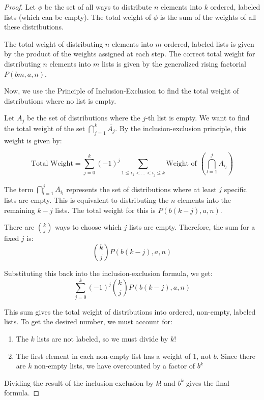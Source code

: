 \documentclass{article}
\newcommand{\rising}[3]{P(#1,#2,#3)}
\begin{document}
\begin{proof}
Let $\phi$ be the set of all ways to distribute $n$ elements into $k$ ordered, labeled lists (which can be empty). The total weight of $\phi$ is the sum of the weights of all these distributions.

The total weight of distributing $n$ elements into $m$ ordered, labeled lists is given by the product of the weights assigned at each step. The correct total weight for distributing $n$ elements into $m$ lists is given by the generalized rising factorial $\rising{bm}{a}{n}$.

Now, we use the Principle of Inclusion-Exclusion to find the total weight of distributions where no list is empty.

Let $A_j$ be the set of distributions where the $j$-th list is empty. We want to find the total weight of the set $\bigcap_{j=1}^k \overline{A_j}$. By the inclusion-exclusion principle, this weight is given by:

\begin{equation}
\text{Total Weight} = \sum_{j=0}^k (-1)^j \sum_{1 \leq i_1 < \dots < i_j \leq k} \text{Weight of } \left( \bigcap_{l=1}^j A_{i_l} \right)
\end{equation}

The term $\bigcap_{l=1}^j A_{i_l}$ represents the set of distributions where at least $j$ specific lists are empty. This is equivalent to distributing the $n$ elements into the remaining $k-j$ lists. The total weight for this is $\rising{b(k-j)}{a}{n}$.

There are $\binom{k}{j}$ ways to choose which $j$ lists are empty. Therefore, the sum for a fixed $j$ is:
\begin{equation}
\binom{k}{j} \rising{b(k-j)}{a}{n}
\end{equation}

Substituting this back into the inclusion-exclusion formula, we get:
\begin{equation}
\sum_{j=0}^k (-1)^j \binom{k}{j} \rising{b(k-j)}{a}{n}
\end{equation}

This sum gives the total weight of distributions into ordered, non-empty, labeled lists. To get the desired number, we must account for:
\begin{enumerate}
    \item The $k$ lists are not labeled, so we must divide by $k!$
    \item The first element in each non-empty list has a weight of 1, not $b$. Since there are $k$ non-empty lists, we have overcounted by a factor of $b^k$
\end{enumerate}

Dividing the result of the inclusion-exclusion by $k!$ and $b^k$ gives the final formula.
\end{proof}
\end{document}
